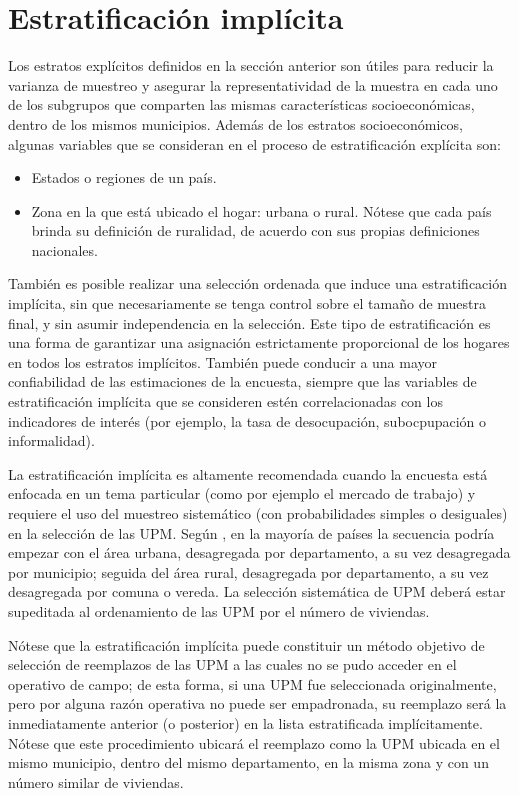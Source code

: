 \documentclass[
  12pt,
  spanish,
]{book}
\providecommand{\tightlist}{%
  \setlength{\itemsep}{0pt}\setlength{\parskip}{0pt}}
\begin{document}
\hypertarget{estratificaciuxf3n-impluxedcita}{%
\section{Estratificación implícita}\label{estratificaciuxf3n-impluxedcita}}

Los estratos explícitos definidos en la sección anterior son útiles para reducir la varianza de muestreo y asegurar la representatividad de la muestra en cada uno de los subgrupos que comparten las mismas características socioeconómicas, dentro de los mismos municipios. Además de los estratos socioeconómicos, algunas variables que se consideran en el proceso de estratificación explícita son:

\begin{itemize}
\tightlist
\item
  Estados o regiones de un país.
\item
  Zona en la que está ubicado el hogar: urbana o rural. Nótese que cada país brinda su definición de ruralidad, de acuerdo con sus propias definiciones nacionales.
\end{itemize}

También es posible realizar una selección ordenada que induce una estratificación implícita, sin que necesariamente se tenga control sobre el tamaño de muestra final, y sin asumir independencia en la selección. Este tipo de estratificación es una forma de garantizar una asignación estrictamente proporcional de los hogares en todos los estratos implícitos. También puede conducir a una mayor confiabilidad de las estimaciones de la encuesta, siempre que las variables de estratificación implícita que se consideren estén correlacionadas con los indicadores de interés (por ejemplo, la tasa de desocupación, subocpupación o informalidad).

La estratificación implícita es altamente recomendada cuando la encuesta está enfocada en un tema particular (como por ejemplo el mercado de trabajo) y requiere el uso del muestreo sistemático (con probabilidades simples o desiguales) en la selección de las UPM. Según \citet[pág. 46]{UN_2008}, en la mayoría de países la secuencia podría empezar con el área urbana, desagregada por departamento, a su vez desagregada por municipio; seguida del área rural, desagregada por departamento, a su vez desagregada por comuna o vereda. La selección sistemática de UPM deberá estar supeditada al ordenamiento de las UPM por el número de viviendas.

Nótese que la estratificación implícita puede constituir un método objetivo de selección de reemplazos de las UPM a las cuales no se pudo acceder en el operativo de campo; de esta forma, si una UPM fue seleccionada originalmente, pero por alguna razón operativa no puede ser empadronada, su reemplazo será la inmediatamente anterior (o posterior) en la lista estratificada implícitamente. Nótese que este procedimiento ubicará el reemplazo como la UPM ubicada en el mismo municipio, dentro del mismo departamento, en la misma zona y con un número similar de viviendas.
\end{document}
